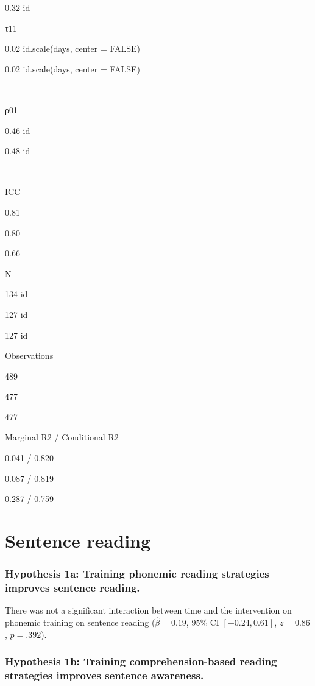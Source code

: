 \documentclass[
  english,
  ,man]{apa6}
\begin{document}
0.32 id

τ11

0.02 id.scale(days, center = FALSE)

0.02 id.scale(days, center = FALSE)

~

ρ01

0.46 id

0.48 id

~

ICC

0.81

0.80

0.66

N

134 id

127 id

127 id

Observations

489

477

477

Marginal R2 / Conditional R2

0.041 / 0.820

0.087 / 0.819

0.287 / 0.759

\hypertarget{sentence-reading}{%
\section{Sentence reading}\label{sentence-reading}}

\hypertarget{hypothesis-1a-training-phonemic-reading-strategies-improves-sentence-reading.}{%
\subsubsection{Hypothesis 1a: Training phonemic reading strategies improves sentence reading.}\label{hypothesis-1a-training-phonemic-reading-strategies-improves-sentence-reading.}}

There was not a significant interaction between time and the intervention on phonemic training on sentence reading (\(\hat{\beta} = 0.19\), 95\% CI \([-0.24, 0.61]\), \(z = 0.86\), \(p = .392\)).

\hypertarget{hypothesis-1b-training-comprehension-based-reading-strategies-improves-sentence-awareness.}{%
\subsubsection{Hypothesis 1b: Training comprehension-based reading strategies improves sentence awareness.}\label{hypothesis-1b-training-comprehension-based-reading-strategies-improves-sentence-awareness.}}
\end{document}
